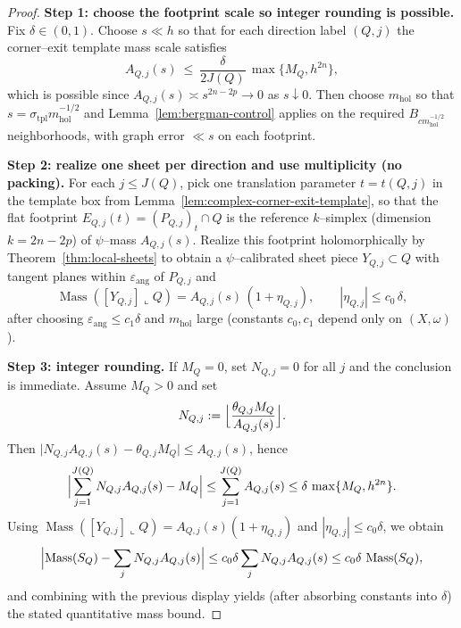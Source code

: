 \documentclass[11pt]{article}
\numberwithin{equation}{section}  %
\theoremstyle{plain}
\theoremstyle{definition}
\theoremstyle{remark}
\newcommand{\mhol}{m_{\mathrm{hol}}} %
\DeclareMathOperator{\Mass}{Mass}
\begin{document}
\begin{proof}
{\noindent\textbf{Step 1: choose the footprint scale so integer rounding is possible.}}
Fix $\delta\in(0,1)$.
Choose $s\ll h$ so that for each direction label $(Q,j)$ the corner--exit template mass scale satisfies
\[
A_{Q,j}(s)\ \le\ \frac{\delta}{2J(Q)}\,\max\{M_Q,h^{2n}\},
\]
which is possible since $A_{Q,j}(s)\asymp s^{2n-2p}\to 0$ as $s\downarrow 0$.
Then choose $\mhol$ so that $s=\sigma_{\mathrm{tpl}}\mhol^{-1/2}$ and Lemma~\ref{lem:bergman-control}
applies on the required $B_{c\mhol^{-1/2}}$ neighborhoods, with graph error $\ll s$ on each footprint.

{\noindent\textbf{Step 2: realize one sheet per direction and use multiplicity (no packing).}}
For each $j\le J(Q)$, pick one translation parameter $t=t(Q,j)$ in the template box from
Lemma~\ref{lem:complex-corner-exit-template}, so that the flat footprint $E_{Q,j}(t)=(P_{Q,j})_t\cap Q$
is the reference $k$--simplex (dimension $k=2n-2p$) of $\psi$--mass $A_{Q,j}(s)$.
Realize this footprint holomorphically by Theorem~\ref{thm:local-sheets} to obtain a $\psi$--calibrated
sheet piece $Y_{Q,j}\subset Q$ with tangent planes within $\varepsilon_{\mathrm{ang}}$ of $P_{Q,j}$ and
\[
\Mass([Y_{Q,j}]\llcorner Q) = A_{Q,j}(s)\,(1+\eta_{Q,j}),\qquad |\eta_{Q,j}|\le c_0\,\delta,
\]
after choosing $\varepsilon_{\mathrm{ang}}\le c_1\delta$ and $\mhol$ large (constants $c_0,c_1$ depend only on $(X,\omega)$).

{\noindent\textbf{Step 3: integer rounding.}}
If $M_Q=0$, set $N_{Q,j}=0$ for all $j$ and the conclusion is immediate.
Assume $M_Q>0$ and set
\[
N_{Q,j}:=\Bigl\lfloor \frac{\theta_{Q,j}M_Q}{A_{Q,j}(s)}\Bigr\rfloor.
\]
Then $\bigl|N_{Q,j}A_{Q,j}(s)-\theta_{Q,j}M_Q\bigr|\le A_{Q,j}(s)$, hence
\[
\Bigl|\sum_{j=1}^{J(Q)}N_{Q,j}A_{Q,j}(s)-M_Q\Bigr|
\le \sum_{j=1}^{J(Q)}A_{Q,j}(s)\le \delta\,\max\{M_Q,h^{2n}\}.
\]
Using $\Mass([Y_{Q,j}]\llcorner Q)=A_{Q,j}(s)(1+\eta_{Q,j})$ and $|\eta_{Q,j}|\le c_0\delta$,
we obtain
\[
\Bigl|\Mass(S_Q)-\sum_{j}N_{Q,j}A_{Q,j}(s)\Bigr|
\le c_0\delta\sum_j N_{Q,j}A_{Q,j}(s)
\le c_0\delta\,\Mass(S_Q),
\]
and combining with the previous display yields (after absorbing constants into $\delta$) the stated quantitative mass bound.


\end{proof}
\end{document}
